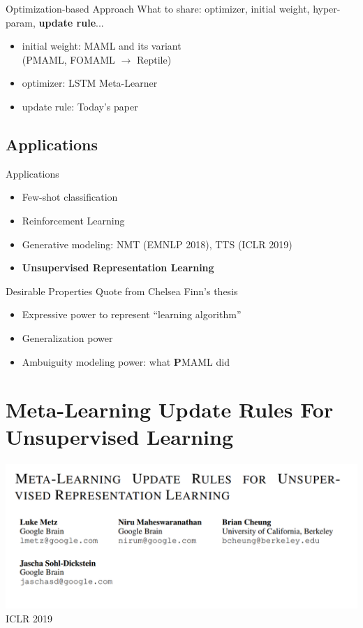 \documentclass{beamer}
\begin{document}
\begin{frame}{Optimization-based Approach}
  What to share: optimizer, initial weight, hyper-param, \textbf{update rule}...
  \begin{itemize}
    \item initial weight: MAML and its variant\\
      (PMAML, FOMAML $\rightarrow$ Reptile)
    \item optimizer: LSTM Meta-Learner
    \item update rule: Today's paper
  \end{itemize}
\end{frame}

\subsection{Applications}

\begin{frame}{Applications}
  \begin{itemize}
    \item Few-shot classification
    \item Reinforcement Learning
    \item Generative modeling: NMT (EMNLP 2018), TTS (ICLR 2019)
    \item \textbf{Unsupervised Representation Learning}
  \end{itemize}
\end{frame}

\begin{frame}{Desirable Properties}
  Quote from Chelsea Finn's thesis
  \begin{itemize}
    \item Expressive power to represent ``learning algorithm''
    \item Generalization power
    \item Ambuiguity modeling power: what \textbf{P}MAML did
  \end{itemize}
\end{frame}


\section{Meta-Learning Update Rules For Unsupervised Learning}
\begin{frame}
  \includegraphics[width=\textwidth]{fig/title.png}
  \center ICLR 2019
\end{frame}
\end{document}
